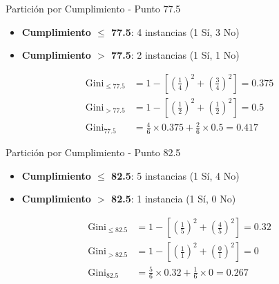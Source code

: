 \documentclass{beamer}
\begin{document}
\begin{frame}{Partición por Cumplimiento - Punto 77.5}
    \begin{itemize}
        \item \textbf{Cumplimiento $\leq$ 77.5}: 4 instancias (1 Sí, 3 No)
        \item \textbf{Cumplimiento $>$ 77.5}: 2 instancias (1 Sí, 1 No)
    \end{itemize}
    
    \vspace{0.5em}
    
    \begin{align*}
        \mathrm{Gini}_{\leq 77.5} &= 1 - \left[\left(\tfrac{1}{4}\right)^2 + \left(\tfrac{3}{4}\right)^2\right] = 0.375 \\
        \mathrm{Gini}_{> 77.5} &= 1 - \left[\left(\tfrac{1}{2}\right)^2 + \left(\tfrac{1}{2}\right)^2\right] = 0.5 \\
        \mathrm{Gini}_{\text{77.5}} &= \tfrac{4}{6}\times0.375 + \tfrac{2}{6}\times0.5 = 0.417
    \end{align*}
\end{frame}

\begin{frame}{Partición por Cumplimiento - Punto 82.5}
    \begin{itemize}
        \item \textbf{Cumplimiento $\leq$ 82.5}: 5 instancias (1 Sí, 4 No)
        \item \textbf{Cumplimiento $>$ 82.5}: 1 instancia (1 Sí, 0 No)
    \end{itemize}
    
    \vspace{0.5em}
    
    \begin{align*}
        \mathrm{Gini}_{\leq 82.5} &= 1 - \left[\left(\tfrac{1}{5}\right)^2 + \left(\tfrac{4}{5}\right)^2\right] = 0.32 \\
        \mathrm{Gini}_{> 82.5} &= 1 - \left[\left(\tfrac{1}{1}\right)^2 + \left(\tfrac{0}{1}\right)^2\right] = 0 \\
        \mathrm{Gini}_{\text{82.5}} &= \tfrac{5}{6}\times0.32 + \tfrac{1}{6}\times0 = 0.267
    \end{align*}
\end{frame}
\end{document}
